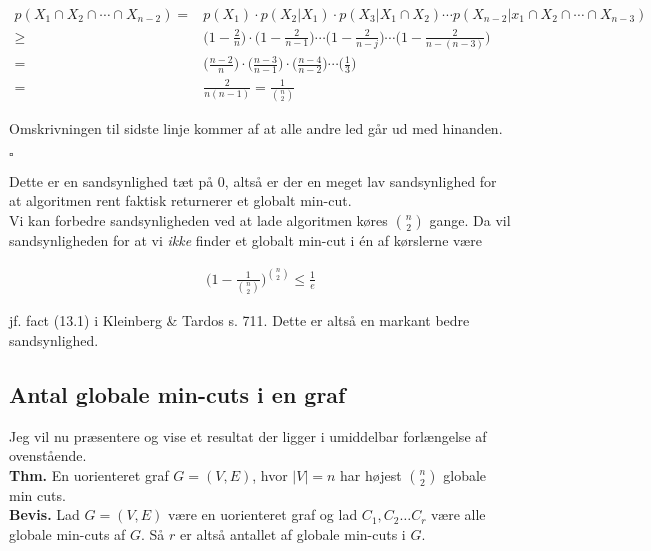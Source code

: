 \documentclass[12pt]{article}
\begin{document}
\begin{align*}
    p(X_1 \cap X_2 \cap \cdots \cap X_{n-2}) =& p(X_1) \cdot p(X_2|X_1) \cdot p(X_3 |X_1 \cap X_2) \cdots p(X_{n-2}|x_1 \cap X_2 \cap \cdots \cap X_{n-3})  \\
    \ge& \bigg(1-\frac{2}{n} \bigg) \cdot \bigg(1-\frac{2}{n-1} \bigg) \cdots \bigg(1-\frac{2}{n-j} \bigg) \cdots \bigg(1-\frac{2}{n-(n-3)} \bigg) \\
    =& \bigg(\frac{n-2}{n} \bigg) \cdot \bigg( \frac{n-3}{n-1} \bigg) \cdot \bigg(\frac{n-4}{n-2} \bigg) \cdots \bigg(\frac{1}{3} \bigg) \\
    =& \frac{2}{n(n-1)} = \frac{1}{\binom{n}{2}}
\end{align*}

Omskrivningen til sidste linje kommer af at alle andre led går ud med hinanden.

\begin{flushright}
    $\square$
\end{flushright}

Dette er en sandsynlighed tæt på 0, altså er der en meget lav sandsynlighed for at algoritmen rent faktisk returnerer et globalt min-cut. \\

Vi kan forbedre sandsynligheden ved at lade algoritmen køres $\binom{n}{2}$ gange. Da vil sandsynligheden for at vi \textit{ikke} finder et globalt min-cut i én af kørslerne være

\begin{align*}
    \bigg(1- \frac{1}{\binom{n}{2}} \bigg)^{\binom{n}{2}} \le \frac{1}{e}
\end{align*}

jf. fact (13.1) i Kleinberg \& Tardos s. 711. Dette er altså en markant bedre sandsynlighed. \\

\subsection*{Antal globale min-cuts i en graf}

Jeg vil nu præsentere og vise et resultat der ligger i umiddelbar forlængelse af ovenstående. \\

\textbf{Thm.} En uorienteret graf $G=(V,E)$, hvor $|V|=n$ har højest $\binom{n}{2}$ globale min cuts. \\

\textbf{Bevis.} Lad $G=(V,E)$ være en uorienteret graf og lad $C_1, C_2 \ldots C_r$ være alle globale min-cuts af $G$. Så $r$ er altså antallet af globale min-cuts i $G$. \\
\end{document}

